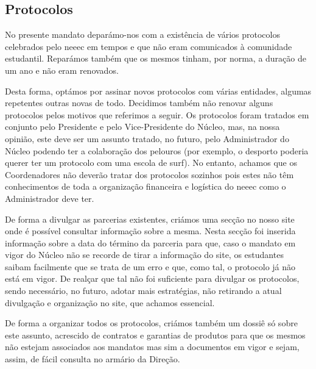 
\subsection{Protocolos}

No presente mandato deparámo-nos com a existência de vários protocolos celebrados pelo \acrshort{neeec} em tempos e que não eram comunicados à comunidade estudantil. Reparámos também que os mesmos tinham, por norma, a duração de um ano e não eram renovados.

Desta forma, optámos por assinar novos protocolos com várias entidades, algumas repetentes outras novas de todo. Decidimos também não renovar alguns protocolos pelos motivos que referimos a seguir. Os protocolos foram tratados em conjunto pelo Presidente e pelo Vice-Presidente do Núcleo, mas, na nossa opinião, este deve ser um assunto tratado, no futuro, pelo Administrador do Núcleo podendo ter a colaboração dos pelouros (por exemplo, o desporto poderia querer ter um protocolo com uma escola de surf). No entanto, achamos que os Coordenadores não deverão tratar dos protocolos sozinhos pois estes não têm conhecimentos de toda a organização financeira e logística do \acrshort{neeec} como o Administrador deve ter.

De forma a divulgar as parcerias existentes, criámos uma secção no nosso site onde é possível consultar informação sobre a mesma. Nesta secção foi inserida informação sobre a data do término da parceria para que, caso o mandato em vigor do Núcleo não se recorde de tirar a informação do site, os estudantes saibam facilmente que se trata de um erro e que, como tal, o protocolo já não está em vigor. De realçar que tal não foi suficiente para divulgar os protocolos, sendo necessário, no futuro, adotar mais estratégias, não retirando a atual divulgação e organização no site, que achamos essencial.

De forma a organizar todos os protocolos, criámos também um dossiê só sobre este assunto, acrescido de contratos e garantias de produtos para que os mesmos não estejam associados aos mandatos mas sim a documentos em vigor e sejam, assim, de fácil consulta no armário da Direção.

